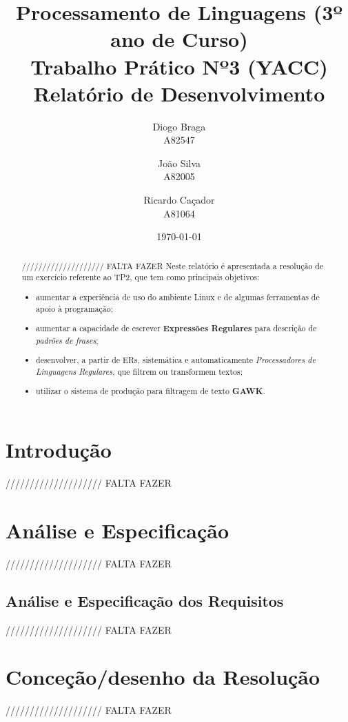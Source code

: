 \documentclass[11pt,a4paper]{report}
\title{Processamento de Linguagens (3º ano de Curso)\\
	\textbf{Trabalho Prático Nº3 (YACC)}\\ Relatório de Desenvolvimento}
\author{Diogo Braga\\ A82547 \and João Silva\\ A82005 \and Ricardo Caçador\\ A81064}
\date{\today}
\begin{document}
\maketitle

\begin{abstract}
	//////////////////// FALTA FAZER
	Neste relatório é apresentada a resolução de um exercício referente ao TP2, que tem como principais objetivos:
	\begin{itemize}
		\item aumentar a experiência de uso do ambiente Linux e de algumas ferramentas de apoio à programação;
 		\item aumentar a capacidade de escrever \textbf{Expressões Regulares} para descrição de \textit{padrões de frases};
 		\item desenvolver, a partir de ERs, sistemática e automaticamente \textit{Processadores de Linguagens Regulares}, que filtrem ou transformem textos;
 		\item utilizar o sistema de produção para filtragem de texto \textbf{GAWK}.
	\end{itemize}
\end{abstract}

\tableofcontents

\newpage

\chapter{Introdução}
\label{chap:intro}

//////////////////// FALTA FAZER


\chapter{Análise e Especificação}
\label{chap:analise}

//////////////////// FALTA FAZER

\section{Análise e Especificação dos Requisitos}

//////////////////// FALTA FAZER

\chapter{Conceção/desenho da Resolução}
\label{chap:concecao}

//////////////////// FALTA FAZER
\end{document}
